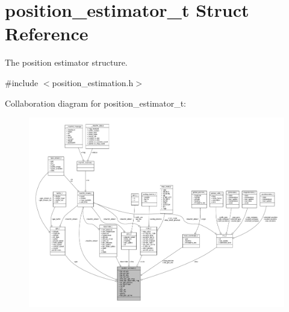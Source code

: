 \hypertarget{structposition__estimator__t}{\section{position\+\_\+estimator\+\_\+t Struct Reference}
\label{structposition__estimator__t}
}


The position estimator structure.  




{\ttfamily \#include $<$position\+\_\+estimation.\+h$>$}



Collaboration diagram for position\+\_\+estimator\+\_\+t\+:
\nopagebreak
\begin{figure}[H]
\begin{center}
\leavevmode
\includegraphics[width=350pt]{structposition__estimator__t__coll__graph}
\end{center}
\end{figure}
